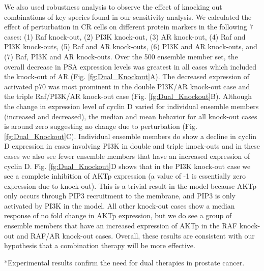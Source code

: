\documentclass[12pt]{article}
\makeatletter
\renewcommand\subsection{\@startsection
	{subsection}{2}{0mm}
	{-0.05in}
	{-0.5\baselineskip}
	{\normalfont\normalsize\bfseries}}
\makeatother
\begin{document}
We also used robustness analysis to observe the effect of knocking out combinations of key species found in our sensitivity analysis. 
We calculated the effect of perturbation in CR cells on different protein markers in the following 7 cases: (1) Raf knock-out, (2) PI3K knock-out, (3) AR knock-out, (4) Raf and PI3K knock-outs, (5) Raf and AR knock-outs, (6) PI3K and AR knock-outs, and (7) Raf, PI3K and AR knock-outs. Over the 500 ensemble member set, the overall decrease in PSA expression levels was greatest in all cases which included the knock-out of AR (Fig. \ref{fg:Dual_Knockout}A). 
The decreased expression of activated p70  was most prominent in the double PI3K/AR knock-out case and the triple Raf/PI3K/AR knock-out case (Fig. \ref{fg:Dual_Knockout}B). 
Although the change in expression level of cyclin D varied for individual ensemble members (increased and decreased), the median and mean behavior for all knock-out cases is around zero suggesting no change due to perturbation (Fig.\ref{fg:Dual_Knockout}C). 
Individual ensemble members do show a decline in cyclin D expression in cases involving PI3K in double and triple knock-outs and in these cases we also see fewer ensemble members that have an increased expression of cyclin D.  
Fig. \ref{fg:Dual_Knockout}D shows that in the PI3K knock-out case we see a complete inhibition of AKTp expression (a value of -1 is essentially zero expression due to knock-out). 
This is a trivial result in the model because AKTp only occurs through PIP3 recruitment to the membrane, and PIP3 is only activated by PI3K in the model. 
All other knock-out cases show a median response of no fold change in AKTp expression, but we do see a group of ensemble members that have an increased expression of AKTp in the RAF knock-out and RAF/AR knock-out cases. 
Overall, these results are consistent with our hypothesis that a combination therapy will be more effective. 

\subsection*{Experimental results confirm the need for dual therapies in prostate cancer.} 
\end{document}

